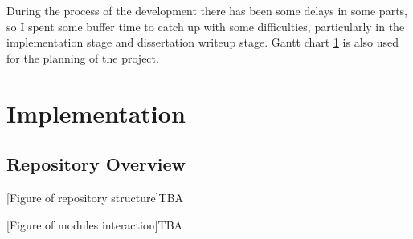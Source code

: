 \documentclass[12pt,a4paper,twoside,openright]{report}
\begin{document}
During the process of the development there has been some delays in some parts, so I spent some buffer time to catch up with some difficulties, particularly in the implementation stage and dissertation writeup stage. Gantt chart \ref{ganttlbl} is also used for the planning of the project.


\begin{figure}\begin{center}\label{ganttlbl}
\end{center}\end{figure}

\chapter{Implementation}\label{chap3}

\section{Repository Overview}

[Figure of repository structure]TBA

[Figure of modules interaction]TBA
\end{document}

